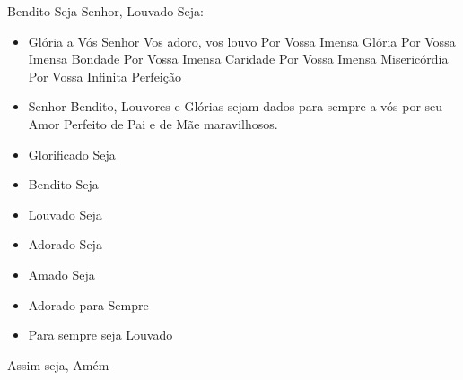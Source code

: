Bendito Seja Senhor, Louvado Seja:
\begin{itemize}
    \item Glória a Vós Senhor
    \subitem Vos adoro, vos louvo
    \subitem Por Vossa Imensa Glória
    \subitem Por Vossa Imensa Bondade
    \subitem Por Vossa Imensa Caridade
    \subitem Por Vossa Imensa Misericórdia
    \subitem Por Vossa Infinita Perfeição
    \item Senhor Bendito, Louvores e Glórias sejam dados para sempre a vós por seu Amor Perfeito de Pai e de Mãe maravilhosos.
    \item Glorificado Seja
    \item Bendito Seja
    \item Louvado Seja
    \item Adorado Seja
    \item Amado Seja
    \item Adorado para Sempre
    \item Para sempre seja Louvado
\end{itemize}

Assim seja, Amém